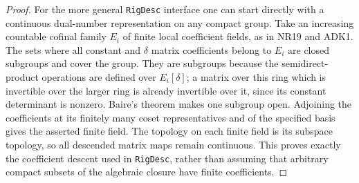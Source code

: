 \documentclass[11pt,a4paper]{article}
\numberwithin{equation}{section}
\theoremstyle{remark}\newtheorem{remark}[theorem]{Remark}
\begin{document}
\begin{proof}
For the more general \texttt{Rig\allowbreak Desc} interface one can start
directly with a continuous dual-number representation on any compact
group.  Take an increasing countable cofinal family $E_i$ of finite
local coefficient fields, as in NR19 and ADK1.  The sets where all
constant and $\delta$ matrix coefficients belong to $E_i$ are
closed subgroups and cover the group.  They are subgroups because
the semidirect-product operations are defined over $E_i[\delta]$;
a matrix over this ring which is invertible over the larger ring
is already invertible over it, since its constant determinant is
nonzero.  Baire's theorem makes one subgroup open.  Adjoining the
coefficients at its finitely many coset representatives and of the
specified basis gives the asserted finite field.  The topology on
each finite field is its subspace topology, so all descended matrix
maps remain continuous.  This proves exactly the coefficient
descent used in \texttt{Rig\allowbreak Desc}, rather than assuming that arbitrary
compact subsets of the algebraic closure have finite coefficients.
\end{proof}
\end{document}
